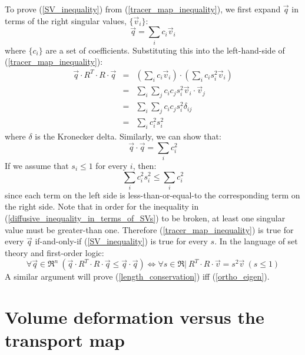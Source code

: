 \documentclass[11pt]{article}
\begin{document}
To prove (\ref{SV_inequality}) from (\ref{tracer_map_inequality}), we first
expand $\vec q$ in terms of the right singular values, 
$\lbrace \vec v_i \rbrace$:
\begin{equation}
	\vec q = \sum_i c_i \vec v_i
\end{equation}
where $\lbrace c_i \rbrace$ are a set of coefficients.
Substituting this into the left-hand-side of (\ref{tracer_map_inequality}):
\begin{eqnarray}
	\vec q \cdot R^T \cdot R \cdot \vec q & = & \left ( \sum_i c_i \vec v_i \right ) \cdot \left (\sum_i c_i s_i^2 \vec v_i \right ) \\
   & = & \sum_i \sum_j c_i c_j s_i^2 \vec v_i \cdot \vec v_j \\
   & = & \sum_i \sum_j c_i c_j s_i^2 \delta_{ij} \\
	  & = & \sum_i c_i^2 s_i^2
\end{eqnarray}
where $\delta$ is the Kronecker delta.
Similarly, we can show that:
\begin{equation}
	\vec q \cdot \vec q = \sum_i c_i^2
\end{equation}
If we assume that $s_i \le 1$ for every $i$, then:
\begin{equation}
	\sum_i c_i^2 s_i^2 \le \sum_i c_i^2 
	\label{diffusive_inequality_in_terms_of_SVs}
\end{equation}
since each term on the left side is less-than-or-equal-to the
corresponding term on the right side. 
Note that in order for the inequality in 
(\ref{diffusive_inequality_in_terms_of_SVs}) to be broken, at least one
singular value must be greater-than one.
Therefore (\ref{tracer_map_inequality}) is true for every $\vec q$
if-and-only-if (\ref{SV_inequality}) is true for every $s$.
In the language of set theory and first-order logic:
\begin{equation}
	\forall \vec q \in \Re^n ~ (\vec q \cdot R^T \cdot R \cdot \vec q \le \vec q \cdot \vec q) \iff \forall s \in \Re | ~R^T \cdot R \cdot \vec v = s^2 \vec v ~ (s \le 1)
\end{equation}
A similar argument will prove (\ref{length_conservation})
iff (\ref{ortho_eigen}).

\section{Volume deformation versus the transport map}
\end{document}
